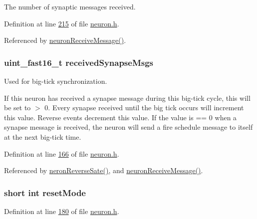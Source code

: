 The number of synaptic messages received. 



Definition at line \hyperlink{neuron_8h_source_l00215}{215} of file \hyperlink{neuron_8h_source}{neuron.\+h}.



Referenced by \hyperlink{neuron_8c_source_l00103}{neuron\+Receive\+Message()}.

\hypertarget{structneuron_state_af8935bcba177f2f3dfb9119c39ef7dc5}{}
\subsubsection[{received\+Synapse\+Msgs}]{\setlength{\rightskip}{0pt plus 5cm}uint\+\_\+fast16\+\_\+t received\+Synapse\+Msgs}\label{structneuron_state_af8935bcba177f2f3dfb9119c39ef7dc5}


Used for big-\/tick synchronization. 

If this neuron has received a synapse message during this big-\/tick cycle, this will be set to $>$ 0. Every synapse received until the big tick occurs will increment this value. Reverse events decrement this value. If the value is == 0 when a synapse message is received, the neuron will send a fire schedule message to itself at the next big-\/tick time. 

Definition at line \hyperlink{neuron_8h_source_l00166}{166} of file \hyperlink{neuron_8h_source}{neuron.\+h}.



Referenced by \hyperlink{neuron_8c_source_l00232}{neron\+Reverse\+Sate()}, and \hyperlink{neuron_8c_source_l00103}{neuron\+Receive\+Message()}.

\hypertarget{structneuron_state_af67bb650aa3150a6a31e16a874d71f91}{}
\subsubsection[{reset\+Mode}]{\setlength{\rightskip}{0pt plus 5cm}short int reset\+Mode}\label{structneuron_state_af67bb650aa3150a6a31e16a874d71f91}


Definition at line \hyperlink{neuron_8h_source_l00180}{180} of file \hyperlink{neuron_8h_source}{neuron.\+h}.



